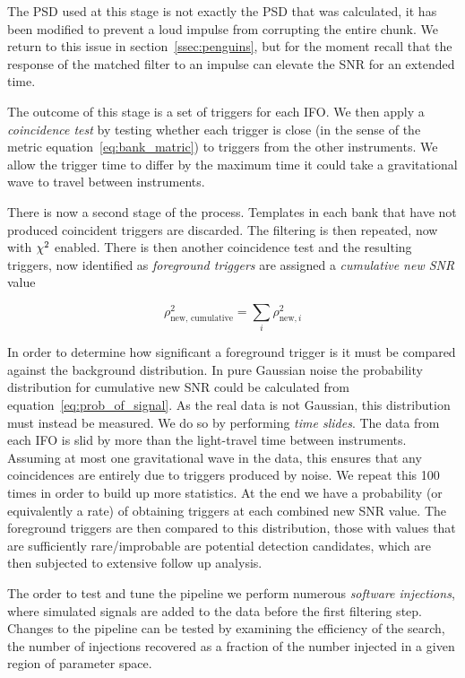 The PSD used at this stage is not exactly the PSD that was calculated,
it has been modified to prevent a loud impulse from corrupting the
entire chunk.  We return to this issue in section~\ref{ssec:penguins},
but for the moment recall that the response of the matched filter to
an impulse can elevate the SNR for an extended time.

The outcome of this stage is a set of triggers for each IFO.  We then
apply a \emph{coincidence test} by testing whether each trigger is
close (in the sense of the metric equation~\ref{eq:bank_matric}) to
triggers from the other instruments.  We allow the trigger time to
differ by the maximum time it could take a gravitational wave to
travel between instruments.

There is now a second stage of the process.  Templates in each bank
that have not produced coincident triggers are discarded.  The
filtering is then repeated, now with $\chi^2$ enabled.  There is then
another coincidence test and the resulting triggers, now identified as
\emph{foreground triggers} are assigned a \emph{cumulative new SNR}
value

\begin{equation*}
\rho_{\textrm{new, cumulative}}^2 = \sum_i \rho_{\textrm{new}, i}^2
\end{equation*}


In order to determine how significant a foreground trigger is it must
be compared against the background distribution.  In pure Gaussian
noise the probability distribution for cumulative new SNR could be
calculated from equation~\ref{eq:prob_of_signal}.  As the real data is
not Gaussian, this distribution must instead be measured.  We do so by
performing \emph{time slides}.  The data from each IFO is slid by more
than the light-travel time between instruments.  Assuming at most one
gravitational wave in the data, this ensures that any coincidences are
entirely due to triggers produced by noise.  We repeat this 100 times
in order to build up more statistics.  At the end we have a
probability (or equivalently a rate) of obtaining triggers at each
combined new SNR value.  The foreground triggers are then compared to
this distribution, those with values that are sufficiently
rare/improbable are potential detection candidates, which are then
subjected to extensive follow up analysis.

The order to test and tune the pipeline we perform numerous
\emph{software injections}, where simulated signals are added to the
data before the first filtering step.  Changes to the pipeline can be
tested by examining the efficiency of the search, the number of
injections recovered as a fraction of the number injected in a given
region of parameter space.

